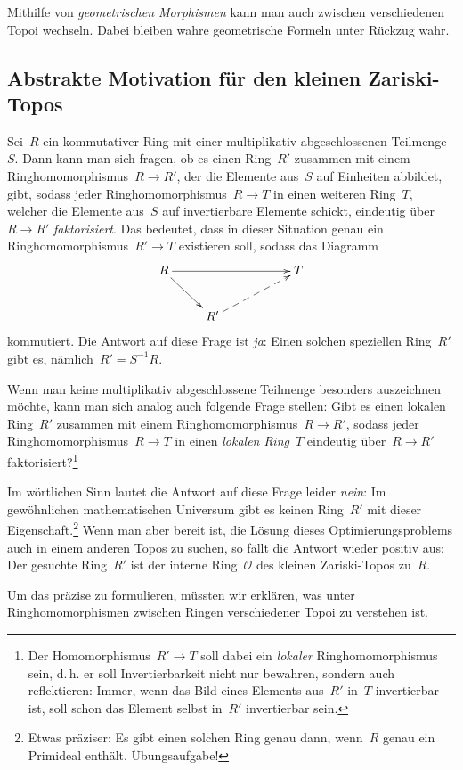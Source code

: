 \documentclass[a4paper,ngerman,12pt]{scrartcl}
\theoremstyle{definition}
\theoremstyle{plain}
\theoremstyle{remark}
\renewcommand{\O}{\mathcal{O}}
\renewcommand{\_}{\mathpunct{.}\,}
\newcommand{\?}{\,{:}\,}
\begin{document}
Mithilfe von \emph{geometrischen Morphismen} kann man auch zwischen
verschiedenen Topoi wechseln. Dabei bleiben wahre geometrische Formeln unter
Rückzug wahr.


\subsection*{Abstrakte Motivation für den kleinen Zariski-Topos}

Sei~$R$ ein kommutativer Ring mit einer multiplikativ abgeschlossenen
Teilmenge~$S$. Dann kann man sich fragen, ob es einen Ring~$R'$ zusammen mit einem
Ringhomomorphismus~$R \to R'$, der die Elemente aus~$S$ auf Einheiten
abbildet, gibt, sodass jeder Ringhomomorphismus~$R \to T$
in einen weiteren Ring~$T$, welcher die Elemente aus~$S$ auf
invertierbare Elemente schickt, eindeutig über~$R \to R'$ \emph{faktorisiert}.
Das bedeutet, dass in dieser Situation genau ein Ringhomomorphismus~$R' \to
T$ existieren soll, sodass das Diagramm
\[ \xymatrix{
  R \ar[rd] \ar[rrr] &&& T \\
  & R' \ar@{-->}[rru]
} \]
kommutiert. Die Antwort auf diese Frage ist \emph{ja}: Einen solchen speziellen
Ring~$R'$ gibt es, nämlich~$R' = S^{-1}R$.

Wenn man keine multiplikativ abgeschlossene Teilmenge besonders auszeichnen
möchte, kann man sich analog auch folgende Frage stellen: Gibt es einen
lokalen Ring~$R'$ zusammen mit einem Ringhomomorphismus~$R \to R'$, sodass jeder
Ringhomomorphismus~$R \to T$ in einen \emph{lokalen Ring}~$T$ eindeutig über~$R
\to R'$ faktorisiert?\footnote{Der Homomorphismus~$R' \to T$ soll dabei ein
\emph{lokaler} Ringhomomorphismus sein, d.\,h. er soll Invertierbarkeit
nicht nur bewahren, sondern auch reflektieren: Immer, wenn das Bild eines
Elements aus~$R'$ in~$T$ invertierbar ist, soll schon das Element selbst
in~$R'$ invertierbar sein.}

Im wörtlichen Sinn lautet die Antwort auf diese Frage leider \emph{nein}: Im
gewöhnlichen mathematischen Universum gibt es keinen Ring~$R'$ mit dieser
Eigenschaft.\footnote{Etwas präziser: Es gibt einen solchen Ring genau dann,
wenn~$R$ genau ein Primideal enthält. Übungsaufgabe!} Wenn man aber bereit ist, die Lösung
dieses Optimierungsproblems auch in einem anderen Topos zu suchen, so fällt die
Antwort wieder positiv aus: Der gesuchte Ring~$R'$ ist der interne Ring~$\O$
des kleinen Zariski-Topos zu~$R$.

Um das präzise zu formulieren, müssten wir erklären, was unter
Ringhomomorphismen zwischen Ringen verschiedener Topoi zu verstehen ist.
\end{document}
